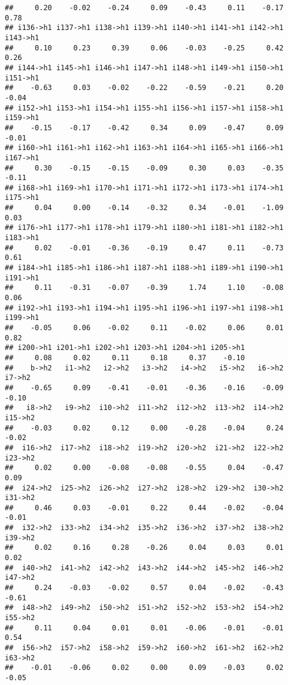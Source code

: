 \documentclass[
]{article}
\begin{document}
\begin{verbatim}
##     0.20    -0.02    -0.24     0.09    -0.43     0.11    -0.17     0.78 
## i136->h1 i137->h1 i138->h1 i139->h1 i140->h1 i141->h1 i142->h1 i143->h1 
##     0.10     0.23     0.39     0.06    -0.03    -0.25     0.42     0.26 
## i144->h1 i145->h1 i146->h1 i147->h1 i148->h1 i149->h1 i150->h1 i151->h1 
##    -0.63     0.03    -0.02    -0.22    -0.59    -0.21     0.20    -0.04 
## i152->h1 i153->h1 i154->h1 i155->h1 i156->h1 i157->h1 i158->h1 i159->h1 
##    -0.15    -0.17    -0.42     0.34     0.09    -0.47     0.09    -0.01 
## i160->h1 i161->h1 i162->h1 i163->h1 i164->h1 i165->h1 i166->h1 i167->h1 
##     0.30    -0.15    -0.15    -0.09     0.30     0.03    -0.35    -0.11 
## i168->h1 i169->h1 i170->h1 i171->h1 i172->h1 i173->h1 i174->h1 i175->h1 
##     0.04     0.00    -0.14    -0.32     0.34    -0.01    -1.09     0.03 
## i176->h1 i177->h1 i178->h1 i179->h1 i180->h1 i181->h1 i182->h1 i183->h1 
##     0.02    -0.01    -0.36    -0.19     0.47     0.11    -0.73     0.61 
## i184->h1 i185->h1 i186->h1 i187->h1 i188->h1 i189->h1 i190->h1 i191->h1 
##     0.11    -0.31    -0.07    -0.39     1.74     1.10    -0.08     0.06 
## i192->h1 i193->h1 i194->h1 i195->h1 i196->h1 i197->h1 i198->h1 i199->h1 
##    -0.05     0.06    -0.02     0.11    -0.02     0.06     0.01     0.82 
## i200->h1 i201->h1 i202->h1 i203->h1 i204->h1 i205->h1 
##     0.08     0.02     0.11     0.18     0.37    -0.10 
##    b->h2   i1->h2   i2->h2   i3->h2   i4->h2   i5->h2   i6->h2   i7->h2 
##    -0.65     0.09    -0.41    -0.01    -0.36    -0.16    -0.09    -0.10 
##   i8->h2   i9->h2  i10->h2  i11->h2  i12->h2  i13->h2  i14->h2  i15->h2 
##    -0.03     0.02     0.12     0.00    -0.28    -0.04     0.24    -0.02 
##  i16->h2  i17->h2  i18->h2  i19->h2  i20->h2  i21->h2  i22->h2  i23->h2 
##     0.02     0.00    -0.08    -0.08    -0.55     0.04    -0.47     0.09 
##  i24->h2  i25->h2  i26->h2  i27->h2  i28->h2  i29->h2  i30->h2  i31->h2 
##     0.46     0.03    -0.01     0.22     0.44    -0.02    -0.04    -0.01 
##  i32->h2  i33->h2  i34->h2  i35->h2  i36->h2  i37->h2  i38->h2  i39->h2 
##     0.02     0.16     0.28    -0.26     0.04     0.03     0.01     0.02 
##  i40->h2  i41->h2  i42->h2  i43->h2  i44->h2  i45->h2  i46->h2  i47->h2 
##     0.24    -0.03    -0.02     0.57     0.04    -0.02    -0.43    -0.61 
##  i48->h2  i49->h2  i50->h2  i51->h2  i52->h2  i53->h2  i54->h2  i55->h2 
##     0.11     0.04     0.01     0.01    -0.06    -0.01    -0.01     0.54 
##  i56->h2  i57->h2  i58->h2  i59->h2  i60->h2  i61->h2  i62->h2  i63->h2 
##    -0.01    -0.06     0.02     0.00     0.09    -0.03     0.02    -0.05 

\end{verbatim}
\end{document}
